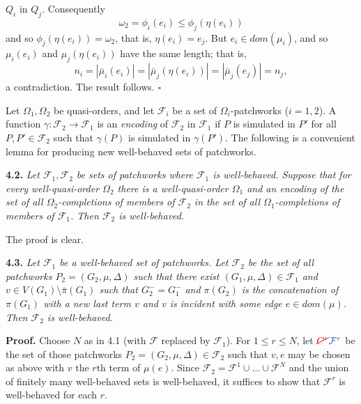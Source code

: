 \noindent $Q_i$ in $Q_j$. Consequently
\begin{equation*}
\omega_2 = \phi_i(e_i) \le \phi_j(\eta(e_i))
\end{equation*}
and so $\phi_j(\eta(e_i)) = \omega_2$, that is, $\eta(e_i) = e_j$. But $e_i \in dom(\mu_i)$, and so $\mu_i(e_i)$ and $\mu_j(\eta(e_i))$ have the same length; that is,
\begin{equation*}
n_i = |\bar{\mu}_i(e_i)| = |\bar{\mu}_j(\eta(e_i))| = |\bar{\mu}_j(e_j)| = n_j,
\end{equation*}
a contradiction. The result follows. $\square$

Let $\Omega_1, \Omega_2$ be quasi-orders, and let $\mathcal{F}_i$ be a set of $\Omega_i$-patchworks ($i = 1, 2$). A function $\gamma : \mathcal{F}_2 \to \mathcal{F}_1$ is an \textit{encoding} of $\mathcal{F}_2$ in $\mathcal{F}_1$ if $P$ is simulated in $P'$ for all $P, P' \in \mathcal{F}_2$ such that $\gamma(P)$ is simulated in $\gamma(P')$. The following is a convenient lemma for producing new well-behaved sets of patchworks.

\textbf{4.2.} \textit{Let $\mathcal{F}_1, \mathcal{F}_2$ be sets of patchworks where $\mathcal{F}_1$ is well-behaved. Suppose that for every well-quasi-order $\Omega_2$ there is a well-quasi-order $\Omega_1$ and an encoding of the set of all $\Omega_2$-completions of members of $\mathcal{F}_2$ in the set of all $\Omega_1$-completions of members of $\mathcal{F}_1$. Then $\mathcal{F}_2$ is well-behaved.}

The proof is clear.

\textbf{4.3.} \textit{Let $\mathcal{F}_1$ be a well-behaved set of patchworks. Let $\mathcal{F}_2$ be the set of all patchworks $P_2 = (G_2, \mu, \Delta)$ such that there exist $(G_1, \mu, \Delta) \in \mathcal{F}_1$ and $v \in V(G_1) \setminus \bar{\pi}(G_1)$ such that $G_2^- = G_1^-$ and $\pi(G_2)$ is the concatenation of $\pi(G_1)$ with a new last term $v$ and $v$ is incident with some edge $e \in dom(\mu)$. Then $\mathcal{F}_2$ is well-behaved.}

\textbf{Proof.} Choose $N$ as in 4.1 (with $\mathcal{F}$ replaced by $\mathcal{F}_1$). For $1 \le r \le N$, let $\delm{C^r}\fix{\mathcal{F}^r}$ be the set of those patchworks $P_2 = (G_2, \mu, \Delta) \in \mathcal{F}_2$ such that $v, e$ may be chosen as above with $v$ the $r$th term of $\mu(e)$. Since $\mathcal{F}_2 = \mathcal{F}^1 \cup \dots \cup \mathcal{F}^N$ and the union of finitely many well-behaved sets is well-behaved, it suffices to show that $\mathcal{F}^r$ is well-behaved for each $r$.

